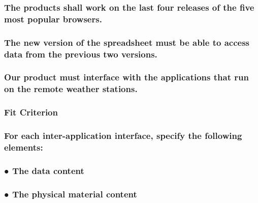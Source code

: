 \documentclass[
]{article}
\begin{document}
\hypertarget{the-products-shall-work-on-the-last-four-releases-of-the-five-most-popular-browsers.}{%
\subsubsection{The products shall work on the last four releases of the
five most popular
browsers.}\label{the-products-shall-work-on-the-last-four-releases-of-the-five-most-popular-browsers.}}

\hypertarget{the-new-version-of-the-spreadsheet-must-be-able-to-access-data-from-the-previous-two-versions.}{%
\subsubsection{The new version of the spreadsheet must be able to access
data from the previous two
versions.}\label{the-new-version-of-the-spreadsheet-must-be-able-to-access-data-from-the-previous-two-versions.}}

\hypertarget{our-product-must-interface-with-the-applications-that-run-on-the-remote-weather-stations.}{%
\subsubsection{Our product must interface with the applications that run
on the remote weather
stations.}\label{our-product-must-interface-with-the-applications-that-run-on-the-remote-weather-stations.}}

\hypertarget{fit-criterion-8}{%
\subsubsection{Fit Criterion}\label{fit-criterion-8}}

\hypertarget{for-each-inter-application-interface-specify-the-following-elements}{%
\subsubsection{For each inter-application interface, specify the
following
elements:}\label{for-each-inter-application-interface-specify-the-following-elements}}

\hypertarget{the-data-content}{%
\subsubsection{● The data content}\label{the-data-content}}

\hypertarget{the-physical-material-content}{%
\subsubsection{● The physical material
content}\label{the-physical-material-content}}
\end{document}
